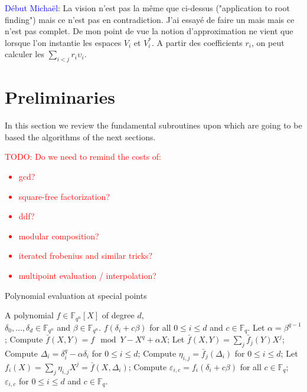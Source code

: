 \documentclass{sig-alternate}
\newcommand{\ff}[1]{\mathbb{F}_{#1}}
\newcommand{\dd}{d}
\newcommand{\qq}{q}
\newcommand{\nn}{n}
\newcommand{\qn}{{\qq^\nn}}
\newcommand{\basef}{\ff{\qq}}
\newcommand{\extf}{\ff{\qn}}
\newcounter{algo}
\newcommand{\todo}[1]{\textcolor{red}{TODO: #1}}
\newcommand{\comd}{\noindent \textcolor{blue}{D\'ebut Micha\"el}:}
\begin{document}
\comd
{\bf }La vision n'est pas la m\^eme que ci-dessus ("application to root finding") mais ce n'est pas en contradiction. J'ai essay\'e de faire un mais mais ce n'est pas complet. De mon point de vue la notion d'approximation ne vient que lorsque l'on instantie les espaces $V_i$ et $V_i^\ast$. A partir des coefficients $r_i$, on peut calculer les $\sum_{i<j} r_i \upsilon_i$.

\section{Preliminaries}

In this section we review the fundamental subroutines upon which are
going to be based the algorithms of the next sections.

\todo{Do we need to remind the costs of:
  \begin{itemize}
  \item gcd?
  \item square-free factorization?
  \item ddf?
  \item modular composition?
  \item iterated frobenius and similar tricks?
  \item multipoint evaluation / interpolation?
  \end{itemize}
}

\begin{algorithm}
  \caption{Polynomial evaluation at special points}
  \label{alg:multi-ev}
  \begin{algorithmic}[1]
    \REQUIRE A polynomial $f\in\extf[X]$ of degree $\dd$,\\
    $\delta_0,\dots,\delta_\dd\in\extf$ and $\beta\in\extf$.
    \ENSURE $f(\delta_i+c\beta)$ for all $0\le i \le \dd$ and $c\in\basef$.
    \STATE Let $\alpha = \beta^{\qq-1}$;
    \STATE\label{alg:multi-ev:mod} Compute $\bar{f}(X,Y) = f \mod Y-X^\qq+\alpha X$;
    \STATE Let $\bar{f}(X,Y) = \sum_j \bar{f}_j(Y)X^j$;
    \STATE\label{alg:multi-ev:Delta} Compute $\Delta_i=\delta_i^\qq-\alpha\delta_i$ for $0\le i\le\dd$;
    \FOR {$0\le j<\qq$}
    \STATE\label{alg:multi-ev:multi-ev} Compute $\eta_{i,j}=\bar{f}_j(\Delta_i)$ for $0\le i\le\dd$;
    \ENDFOR
    \STATE Let $f_i(X) = \sum_j \eta_{i,j}X^j=\bar{f}(X,\Delta_i)$;
    \FOR {$0\le i \le\dd$}
    \STATE\label{alg:multi-ev:final-ev} Compute $\varepsilon_{i,c}=f_i(\delta_i+c\beta)$ for all $c\in\basef$;
    \ENDFOR
    \RETURN $\varepsilon_{i,c}$ for $0\le i\le\dd$ and $c\in\basef$.
  \end{algorithmic}
\end{algorithm}
\end{document}
